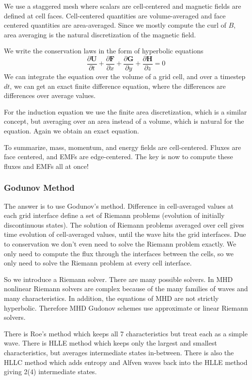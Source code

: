 \documentclass[letterpaper, 11pt]{article}
\numberwithin{equation}{section}
\numberwithin{figure}{section}
\begin{document}
We use a staggered mesh where scalars are cell-centered and magnetic fields are
defined at cell faces. Cell-centered quantities are volume-averaged and face
centered quantities are area-averaged. Since we mostly compute the curl of $B$,
area averaging is the natural discretization of the magnetic field.

We write the conservation laws in the form of hyperbolic equations
\begin{equation}
  \label{eq:12}
  \frac{\partial \mathbf{U}}{\partial t} + \frac{\partial \mathbf{F}}{\partial x} + \frac{\partial \mathbf{G}}{\partial y} + \frac{\partial \mathbf{H}}{\partial z} = 0
\end{equation}
We can integrate the equation over the volume of a grid cell, and over a
timestep $dt$, we can get an exact finite difference equation, where the
differences are differences over average values.

For the induction equation we use the finite area discretization, which is a
similar concept, but averaging over an area instead of a volume, which is
natural for the equation. Again we obtain an exact equation.

To summarize, mass, momentum, and energy fields are cell-centered. Fluxes are
face centered, and EMFs are edge-centered. The key is now to compute these
fluxes and EMFs all at once!

\subsubsection{Godunov Method}

The answer is to use Godunov's method. Difference in cell-averaged values at
each grid interface define a set of Riemann problems (evolution of initially
discontinuous states). The solution of Riemann problems averaged over cell gives
time evolution of cell-averaged values, until the wave hits the grid interfaces.
Due to conservation we don't even need to solve the Riemann problem exactly. We
only need to compute the flux through the interfaces between the cells, so we
only need to solve the Riemann problem at every cell interface.

So we introduce a Riemann solver. There are many possible solvers. In MHD
nonlinear Riemann solvers are complex because of the many families of waves and
many characteristics. In addition, the equations of MHD are not strictly
hyperbolic. Therefore MHD Gudonov schemes use approximate or linear Riemann
solvers.

There is Roe's method which keeps all 7 characteristics but treat each as a
simple wave. There is HLLE method which keeps only the largest and smallest
characteristics, but averages intermediate states in-between. There is also the
HLLC method which adds entropy and Alfven waves back into the HLLE method giving
2(4) intermediate states.
\end{document}
